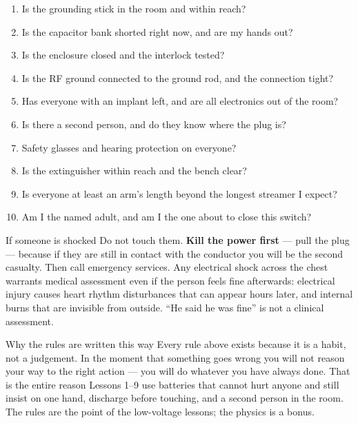 \begin{telosframe}
\begin{enumerate}[leftmargin=1.4em,itemsep=0.1em]
\item Is the grounding stick in the room and within reach?
\item Is the capacitor bank shorted right now, and are my hands out?
\item Is the enclosure closed and the interlock tested?
\item Is the RF ground connected to the ground rod, and the connection tight?
\item Has everyone with an implant left, and are all electronics out of the room?
\item Is there a second person, and do they know where the plug is?
\item Safety glasses and hearing protection on everyone?
\item Is the extinguisher within reach and the bench clear?
\item Is everyone at least an arm's length beyond the longest streamer I expect?
\item Am I the named adult, and am I the one about to close this switch?
\end{enumerate}
\end{telosframe}

\begin{teloshazard}{If someone is shocked}
Do not touch them. \textbf{Kill the power first} --- pull the plug --- because
if they are still in contact with the conductor you will be the second casualty.
Then call emergency services. Any electrical shock across the chest warrants
medical assessment even if the person feels fine afterwards: electrical injury
causes heart rhythm disturbances that can appear hours later, and internal
burns that are invisible from outside. ``He said he was fine'' is not a
clinical assessment.
\end{teloshazard}

\begin{telospanel}{Why the rules are written this way}
Every rule above exists because it is a habit, not a judgement. In the moment
that something goes wrong you will not reason your way to the right action ---
you will do whatever you have always done. That is the entire reason Lessons
1--9 use batteries that cannot hurt anyone and still insist on one hand,
discharge before touching, and a second person in the room. The rules are the
point of the low-voltage lessons; the physics is a bonus.
\end{telospanel}



